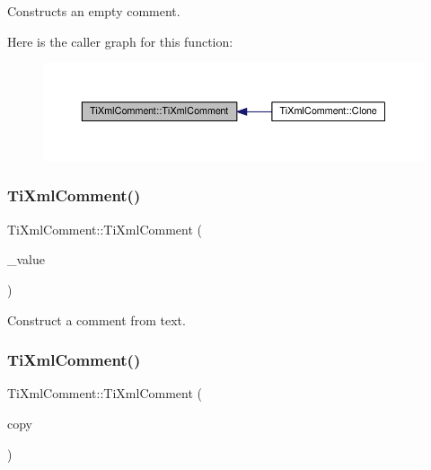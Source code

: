 Constructs an empty comment. 

Here is the caller graph for this function\+:\nopagebreak
\begin{figure}[H]
\begin{center}
\leavevmode
\includegraphics[width=350pt]{class_ti_xml_comment_aaa3252031d3e8bd3a2bf51a1c61201b7_icgraph}
\end{center}
\end{figure}
\mbox{\label{class_ti_xml_comment_a37e7802ef17bc03ebe5ae79bf0713d47}} 
\subsubsection{\texorpdfstring{Ti\+Xml\+Comment()}{TiXmlComment()}\hspace{0.1cm}{\footnotesize\ttfamily [2/3]}}
{\footnotesize\ttfamily Ti\+Xml\+Comment\+::\+Ti\+Xml\+Comment (\begin{DoxyParamCaption}\item[{const char $\ast$}]{\+\_\+value }\end{DoxyParamCaption})\hspace{0.3cm}{\ttfamily [inline]}}



Construct a comment from text. 

\mbox{\label{class_ti_xml_comment_afaec41ac2760ce946ba1590eb5708e50}} 
\subsubsection{\texorpdfstring{Ti\+Xml\+Comment()}{TiXmlComment()}\hspace{0.1cm}{\footnotesize\ttfamily [3/3]}}
{\footnotesize\ttfamily Ti\+Xml\+Comment\+::\+Ti\+Xml\+Comment (\begin{DoxyParamCaption}\item[{const \hyperlink{class_ti_xml_comment}{Ti\+Xml\+Comment} \&}]{copy }\end{DoxyParamCaption})}

